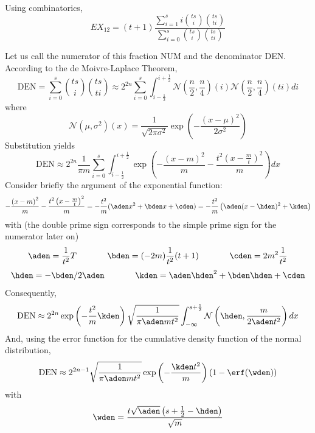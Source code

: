 \documentclass[phd,12pt,oneside]{ubcthesis}
\begin{document}
Using combinatorics,
\begin{equation}
  \label{eq:idooyeib}
  EX_{12}=(t+1)\frac{\sum_{i=1}^{s}i\binom{ts}{i}\binom{ts}{ti}}{\sum_{i=0}^{s}\binom{ts}{i}\binom{ts}{ti}}
\end{equation}

{\noindent}Let us call the numerator of this fraction NUM and the denominator
DEN. According to the de Moivre-Laplace Theorem,
\begin{equation}
  \label{eq:uumavael}
  \mbox{DEN}=\sum_{i=0}^{s}\binom{ts}{i}\binom{ts}{ti}\approx{}2^{2n}\sum_{i=0}^{s}\int_{i-\frac{1}{2}}^{i+\frac{1}{2}}\mathcal{N}(\frac{n}{2},\frac{n}{4})(i)\mathcal{N}(\frac{n}{2},\frac{n}{4})(ti)di
\end{equation}
where
\begin{equation}
  \label{eq:shiewain}
  \mathcal{N}(\mu,\sigma^{2})(x)=\frac{1}{\sqrt{2\pi\sigma^{2}}}\exp\left(-\frac{(x-\mu)^{2}}{2\sigma^{2}}\right)
\end{equation}
Substitution yields
\begin{equation}
  \label{eq:wahweele}
  \mbox{DEN}\approx{}2^{2n}\frac{1}{\pi{}m}\sum_{i=0}^{s}\int_{i-\frac{1}{2}}^{i+\frac{1}{2}}\exp\left(-\frac{\left(x-m\right)^{2}}{m}-\frac{t^{2}\left(x-\frac{m}{t}\right)^{2}}{m}\right)dx
\end{equation}
Consider briefly the argument of the exponential function:
\begin{equation}
  \label{eq:augahghu}
  -\frac{\left(x-m\right)^{2}}{m}-\frac{t^{2}\left(x-\frac{m}{t}\right)^{2}}{m}=-\frac{t^{2}}{m}({\aden}x^{2}+{\bden}x+{\cden})=-\frac{t^{2}}{m}\left({\aden}(x-{\hden})^{2}+{\kden}\right)
\end{equation}
with (the double prime sign corresponds to the simple prime sign for
the numerator later on)
\begin{equation}
  \label{eq:aiphueri}
{\aden}=\frac{1}{t^{2}}{T}\notag\hspace{.5in}
{\bden}=(-2m)\frac{1}{t^{2}}(t+1)\hspace{.5in}
{\cden}=2m^{2}\frac{1}{t^{2}}
\end{equation}
\begin{equation}
  \label{eq:quoseoth}
{\hden}=-{\bden}/2{\aden}\hspace{.5in}
{\kden}={\aden}{\hden}^{2}+{\bden}{\hden}+{\cden}
\end{equation}
Consequently,
\begin{equation}
  \label{eq:sheyupei}
\mbox{DEN}\approx{}2^{2n}\exp\left(-\frac{t^{2}}{m}{\kden}\right)\sqrt{\frac{1}{\pi{}{\aden}mt^{2}}}\int_{-\infty}^{s+\frac{1}{2}}\mathcal{N}\left({\hden},\frac{m}{2{\aden}t^{2}}\right)dx
\end{equation}
And, using the error function for the cumulative density function of
the normal distribution,
\begin{equation}
  \label{eq:den}
  \mbox{DEN}\approx{}2^{2n-1}\sqrt{\frac{1}{\pi{}{\aden}mt^{2}}}\exp\left(-\frac{{\kden}t^{2}}{m}\right)\left(1-\erf({\wden})\right)
\end{equation}
with
\begin{equation}
  \label{eq:beseituc}
  {\wden}=\frac{t\sqrt{{\aden}}\left(s+\frac{1}{2}-{\hden}\right)}{\sqrt{m}}
\end{equation}
\end{document}
